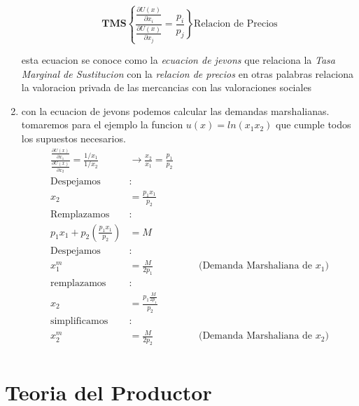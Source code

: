 \documentclass[11pt]{article}
\begin{document}
\begin{flushleft}
\begin{enumerate}
        $$\textbf{TMS}\left\{\frac{\frac{\partial U(x)}{\partial x_i}}{\frac{\partial U(x)}{\partial x_j}}\right.=\left. \frac{p_i}{p_j}\right\}\text{Relacion de Precios}$$

        esta ecuacion se conoce como la \textit{ecuacion de jevons} que relaciona la \textit{Tasa Marginal de Sustitucion} con la \textit{relacion de precios} en otras palabras relaciona la valoracion privada de las mercancias con las valoraciones sociales

        \item con la ecuacion de jevons podemos calcular las demandas marshalianas. tomaremos para el ejemplo la funcion $u(x)=ln(x_1x_2)$ que cumple todos los supuestos necesarios.
        \begin{align*}
            \frac{\frac{\partial U(x)}{\partial x_1}}{\frac{\partial U(x)}{\partial x_2}} = \frac{1/x_1}{1/x_2}&\to  \frac{x_2}{x_1} = \frac{p_1}{p_2} \\
            \text{Despejamos} &: \\
            x_2 &= \frac{p_1x_1}{p_2} && \\
            \text{Remplazamos} &: \\
            p_1x_1 + p_2\left(\frac{p_1x_1}{p_2}\right) &= M && \\
            \text{Despejamos} &: \\
            x_1^m &= \frac{M}{2p_1} && \quad \text{(Demanda Marshaliana de } x_1)\\
            \text{remplazamos} &: \\
            x_2 &= \frac{p_1\frac{M}{2p_1}}{p_2} && \\
            \text{simplificamos} &: \\
            x_2^m &= \frac{M}{2p_2} && \quad \text{(Demanda Marshaliana de } x_2)\\
        \end{align*}
    \end{enumerate}
    
\end{flushleft}

\section{Teoria del Productor}
\end{document}

